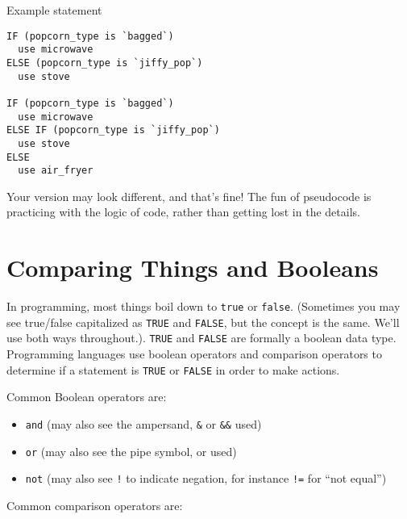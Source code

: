 \documentclass[
]{book}
\providecommand{\tightlist}{%
  \setlength{\itemsep}{0pt}\setlength{\parskip}{0pt}}
\begin{document}
Example statement

\begin{verbatim}
IF (popcorn_type is `bagged`)
  use microwave
ELSE (popcorn_type is `jiffy_pop`)
  use stove

IF (popcorn_type is `bagged`)
  use microwave
ELSE IF (popcorn_type is `jiffy_pop`)
  use stove
ELSE 
  use air_fryer
\end{verbatim}

Your version may look different, and that's fine! The fun of pseudocode is practicing with the logic of code, rather than getting lost in the details.

\hfill\break

\section{Comparing Things and Booleans}\label{comparing-things-and-booleans}

In programming, most things boil down to \texttt{true} or \texttt{false}. (Sometimes you may see true/false capitalized as \texttt{TRUE} and \texttt{FALSE}, but the concept is the same. We'll use both ways throughout.). \texttt{TRUE} and \texttt{FALSE} are formally a boolean data type. Programming languages use boolean operators and comparison operators to determine if a statement is \texttt{TRUE} or \texttt{FALSE} in order to make actions.

Common Boolean operators are:\\

\begin{itemize}
\tightlist
\item
  \texttt{and} (may also see the ampersand, \texttt{\&} or \texttt{\&\&} used)
\item
  \texttt{or} (may also see the pipe symbol, \texttt{\textbar{}} or \texttt{\textbar{}\textbar{}} used)
\item
  \texttt{not} (may also see \texttt{!} to indicate negation, for instance \texttt{!=} for ``not equal'')
\end{itemize}

Common comparison operators are:
\end{document}
